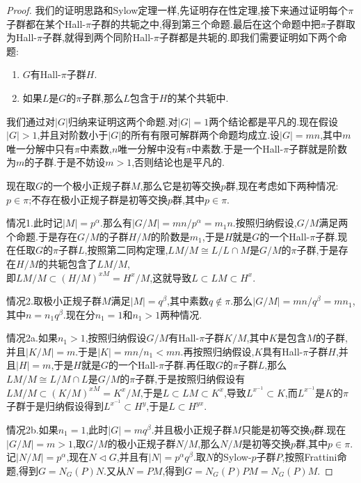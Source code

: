 \begin{proof}
	
	我们的证明思路和Sylow定理一样,先证明存在性定理,接下来通过证明每个$\pi$子群都在某个Hall-$\pi$子群的共轭之中,得到第三个命题.最后在这个命题中把$\pi$子群取为Hall-$\pi$子群,就得到两个同阶Hall-$\pi$子群都是共轭的.即我们需要证明如下两个命题:
	\begin{enumerate}
		\item $G$有Hall-$\pi$子群$H$.
		\item 如果$L$是$G$的$\pi$子群,那么$L$包含于$H$的某个共轭中.
	\end{enumerate}
	
	我们通过对$|G|$归纳来证明这两个命题.对$|G|=1$两个结论都是平凡的.现在假设$|G|>1$,并且对阶数小于$|G|$的所有有限可解群两个命题均成立.设$|G|=mn$,其中$m$唯一分解中只有$\pi$中素数,$n$唯一分解中没有$\pi$中素数.于是一个Hall-$\pi$子群就是阶数为$m$的子群.于是不妨设$m>1$,否则结论也是平凡的.
	
	现在取$G$的一个极小正规子群$M$,那么它是初等交换$p$群,现在考虑如下两种情况:$p\in\pi$;不存在极小正规子群是初等交换$p$群,其中$p\in\pi$.
	
	情况1.此时记$|M|=p^{\alpha}$.那么有$|G/M|=mn/p^{\alpha}=m_1n$.按照归纳假设,$G/M$满足两个命题.于是存在$G/M$的子群$H/M$的阶数是$m_1$,于是$H$就是$G$的一个Hall-$\pi$子群.现在任取$G$的$\pi$子群$L$,按照第二同构定理,$LM/M\cong L/L\cap M$是$G/M$的$\pi$子群,于是存在$H/M$的共轭包含了$LM/M$,\\
	即$LM/M\subset(H/M)^{xM}=H^x/M$,这就导致$L\subset LM\subset H^x$.
	
	情况2.取极小正规子群$M$满足$|M|=q^{\beta}$,其中素数$q\not\in\pi$.那么$|G/M|=mn/q^{\beta}=mn_1$,其中$n=n_1q^{\beta}$.现在分$n_1=1$和$n_1>1$两种情况.
	
	情况2a.如果$n_1>1$,按照归纳假设$G/M$有Hall-$\pi$子群$K/M$,其中$K$是包含$M$的子群,并且$|K/M|=m$.于是$|K|=mn/n_1<mn$.再按照归纳假设,$K$具有Hall-$\pi$子群$H$,并且$|H|=m$,于是$H$就是$G$的一个Hall-$\pi$子群.再任取$G$的$\pi$子群$L$,那么$LM/M\cong L/M\cap L$是$G/M$的$\pi$子群,于是按照归纳假设有$LM/M\subset(K/M)^{xM}=K^x/M$,于是$L\subset LM\subset K^x$,导致$L^{x^{-1}}\subset K$,而$L^{x^{-1}}$是$K$的$\pi$子群于是归纳假设得到$L^{x^{-1}}\subset H^y$,于是$L\subset H^{yx}$.
	
	情况2b.如果$n_1=1$,此时$|G|=mq^{\beta}$.并且极小正规子群$M$只能是初等交换$q$群.现在$|G/M|=m>1$,取$G/M$的极小正规子群$N/M$,那么$N/M$是初等交换$p$群,其中$p\in\pi$.记$|N/M|=p^{\alpha}$,现在$N\triangleleft G$,并且有$|N|=p^{\alpha}q^{\beta}$.取$N$的Sylow-$p$子群$P$,按照Frattini命题,得到$G=N_G(P)N$.又从$N=PM$,得到$G=N_G(P)PM=N_G(P)M$.
	

\end{proof}
